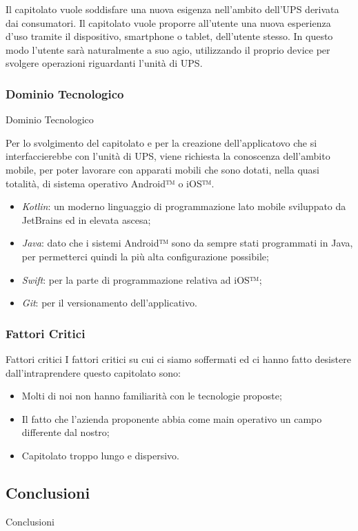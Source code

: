 \documentclass[11pt]{article}
\begin{document}
        Il capitolato vuole soddisfare una nuova esigenza nell'ambito dell'UPS derivata dai consumatori.
        Il capitolato vuole proporre all’utente una nuova esperienza d’uso tramite il dispositivo, smartphone o
        tablet, dell’utente stesso.
        In questo modo l’utente sarà naturalmente a suo agio, utilizzando il proprio device per svolgere operazioni riguardanti l'unità di UPS.
        \subsubsection{Dominio Tecnologico} Dominio Tecnologico
        
        Per lo svolgimento del capitolato e per la creazione dell'applicatovo che si interfaccierebbe con l'unità di UPS, viene richiesta la conoscenza dell'ambito mobile, per poter lavorare con apparati mobili che sono dotati, nella quasi totalità, di sistema operativo Android™ o iOS™.
        \begin{itemize}
            \item \textit{Kotlin}: un moderno linguaggio di programmazione lato mobile sviluppato da JetBrains ed in elevata ascesa;
            \item \textit{Java}: dato che i sistemi Android™ sono da sempre stati programmati in Java, per permetterci quindi la più alta configurazione possibile;
            \item \textit{Swift}: per la parte di programmazione relativa ad iOS™;
            \item \textit{Git}: per il versionamento dell'applicativo.
        \end{itemize}
    
    \subsubsection{Fattori Critici} Fattori critici
    I fattori critici su cui ci siamo soffermati ed ci hanno fatto desistere dall'intraprendere questo capitolato sono:
    \begin{itemize}
            \item Molti di noi non hanno familiarità con le tecnologie proposte;
            \item Il fatto che l'azienda proponente abbia come main operativo un campo differente dal nostro; 
            \item Capitolato troppo lungo e dispersivo.
        \end{itemize}
    \subsection{Conclusioni} Conclusioni
    
\end{document}
